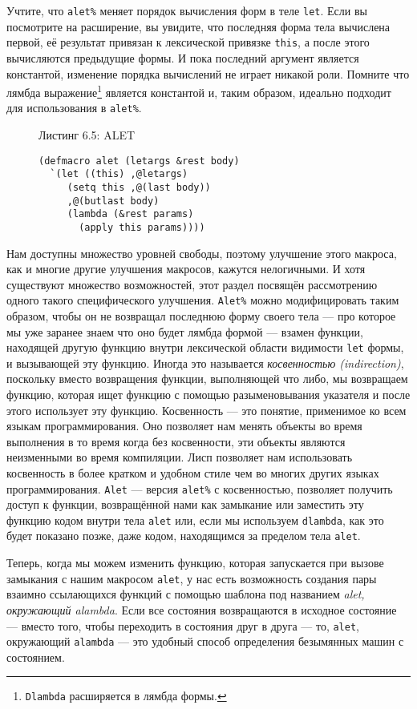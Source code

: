 Учтите, что \verb"alet%" меняет порядок вычисления форм в теле \verb"let". Если вы посмотрите на расширение, вы увидите, что последняя форма тела вычислена первой, её результат привязан к лексической привязке \verb"this", а после этого вычисляются предыдущие формы. И пока последний аргумент является константой, изменение порядка вычислений не играет никакой роли. Помните что лямбда выражение\footnote{\verb"Dlambda" расширяется в лямбда формы.} является константой и, таким образом, идеально подходит для использования в \verb"alet%".



\begin{figure}Листинг 6.5: ALET\label{listing_6.5}
\listbegin
\begin{verbatim}
(defmacro alet (letargs &rest body)
  `(let ((this) ,@letargs)
     (setq this ,@(last body))
     ,@(butlast body)
     (lambda (&rest params)
       (apply this params))))
\end{verbatim}
\listend
\end{figure}

Нам доступны множество уровней свободы, поэтому улучшение этого макроса, как и многие другие улучшения макросов, кажутся нелогичными. И хотя существуют множество возможностей, этот раздел посвящён рассмотрению одного такого специфического улучшения. \verb"Alet%" можно модифицировать таким образом, чтобы он не возвращал последнюю форму своего тела --- про которое мы уже заранее знаем что оно будет лямбда формой --- взамен функции, находящей другую функцию внутри лексической области видимости \verb"let" формы, и вызывающей эту функцию. Иногда это называется \emph{косвенностью (indirection)}, поскольку вместо возвращения функции, выполняющей что либо, мы возвращаем функцию, которая ищет функцию с помощью разыменовывания указателя и после этого использует эту функцию. Косвенность --- это понятие, применимое ко всем языкам программирования. Оно позволяет нам менять объекты во время выполнения в то время когда без косвенности, эти объекты являются неизменными во время компиляции. Лисп позволяет нам использовать косвенность в более кратком и удобном стиле чем во многих других языках программирования. \verb"Alet" --- версия \verb"alet%" с косвенностью, позволяет получить доступ к функции, возвращённой нами как замыкание или заместить эту функцию кодом внутри тела \verb"alet" или, если мы используем \verb"dlambda", как это будет показано позже, даже кодом, находящимся за пределом тела \verb"alet".

Теперь, когда мы можем изменить функцию, которая запускается при вызове замыкания с нашим макросом \verb"alet", у нас есть возможность создания пары взаимно ссылающихся функций с помощью шаблона под названием \emph{alet, окружающий alambda}. Если все состояния возвращаются в исходное состояние --- вместо того, чтобы переходить в состояния друг в друга --- то, \verb"alet", окружающий \verb"alambda" --- это удобный способ определения безымянных машин с состоянием.

